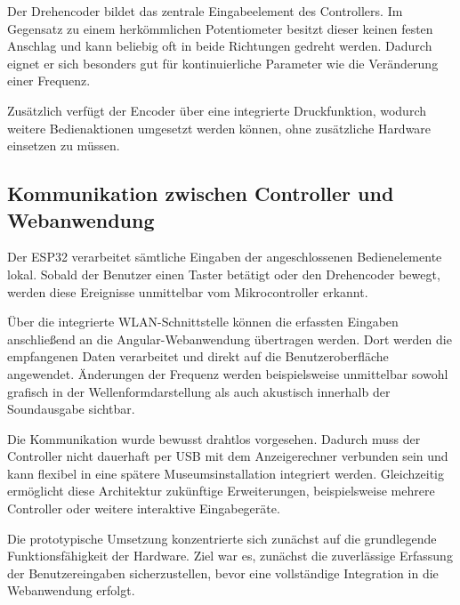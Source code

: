 Der Drehencoder bildet das zentrale Eingabeelement des Controllers. Im Gegensatz zu
einem herkömmlichen Potentiometer besitzt dieser keinen festen Anschlag und kann
beliebig oft in beide Richtungen gedreht werden. Dadurch eignet er sich besonders gut
für kontinuierliche Parameter wie die Veränderung einer Frequenz.

Zusätzlich verfügt der Encoder über eine integrierte Druckfunktion, wodurch weitere
Bedienaktionen umgesetzt werden können, ohne zusätzliche Hardware einsetzen zu
müssen.

\subsection{Kommunikation zwischen Controller und Webanwendung}

Der ESP32 verarbeitet sämtliche Eingaben der angeschlossenen Bedienelemente lokal.
Sobald der Benutzer einen Taster betätigt oder den Drehencoder bewegt, werden diese
Ereignisse unmittelbar vom Mikrocontroller erkannt.

Über die integrierte WLAN-Schnittstelle können die erfassten Eingaben anschließend an
die Angular-Webanwendung übertragen werden. Dort werden die empfangenen Daten
verarbeitet und direkt auf die Benutzeroberfläche angewendet. Änderungen der
Frequenz werden beispielsweise unmittelbar sowohl grafisch in der
Wellenformdarstellung als auch akustisch innerhalb der Soundausgabe sichtbar.

Die Kommunikation wurde bewusst drahtlos vorgesehen. Dadurch muss der Controller
nicht dauerhaft per USB mit dem Anzeigerechner verbunden sein und kann flexibel in
eine spätere Museumsinstallation integriert werden. Gleichzeitig ermöglicht diese
Architektur zukünftige Erweiterungen, beispielsweise mehrere Controller oder weitere
interaktive Eingabegeräte.

Die prototypische Umsetzung konzentrierte sich zunächst auf die grundlegende
Funktionsfähigkeit der Hardware. Ziel war es, zunächst die zuverlässige Erfassung der
Benutzereingaben sicherzustellen, bevor eine vollständige Integration in die
Webanwendung erfolgt.

